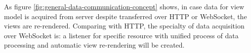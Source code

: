 As figure \ref{fig:general-data-communication-concept} shows, in case data for view model is acquired from server despite transferred over HTTP or WebSocket, the views are re-rendered. Comparing with HTTP, the specialty of data acquisition over WebSocket is: a listener for specific resource with unified process of data processing and automatic view re-rendering will be created.